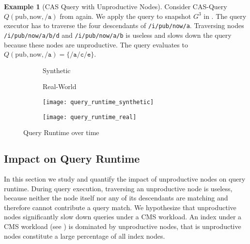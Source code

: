 \documentclass[abstracton,12pt]{scrartcl}
\theoremstyle{definition}
\newtheorem{example}{Example}
\begin{document}
\begin{example}[CAS Query with Unproductive Nodes]
  Consider CAS-Query $Q(\text{pub},\text{now},\texttt{/a})$ from
   again. We apply the query to snapshot $G^3$ in
  . The query executor has to traverse the four
  descendants of \texttt{/i/pub/now/a}. Traversing nodes
  \texttt{/i/pub/now/a/b/d} and \texttt{/i/pub/now/a/b} is useless and slows down the
  query because these nodes are unproductive. The query evaluates to
  $Q(\text{pub},\text{now},\texttt{/a}) = \{\texttt{/a/c/e}\}$.
\end{example}

\newpage

\begin{figure}[H]
  \centering
  \begin{subfigure}{0.49\linewidth}
    \centering
    Synthetic
  \end{subfigure}
  \begin{subfigure}{0.49\linewidth}
    \centering
    Real-World
  \end{subfigure}
  \begin{subfigure}{0.49\linewidth}
    \centering
    \texttt{[image: query\_runtime\_synthetic]}
    \caption{}
    \label{fig:query_runtime_synthetic}
  \end{subfigure}
  \begin{subfigure}{0.49\linewidth}
    \centering
    \texttt{[image: query\_runtime\_real]}
    \caption{}
    \label{fig:query_runtime_real}
  \end{subfigure}
  \caption{Query Runtime over time}
  \label{fig:query_runtime}
\end{figure}

\subsection{Impact on Query Runtime}

In this section we study and quantify the impact of unproductive nodes on
query runtime. During query execution, traversing an unproductive node is
useless, because neither the node itself nor any of its descendants are matching
and therefore cannot contribute a query match. We hypothesize that unproductive nodes
significantly slow down queries under a CMS workload.
An index under a CMS workload (see ) is dominated
by unproductive nodes, that is unproductive nodes constitute a large percentage
of all index nodes.
\end{document}
